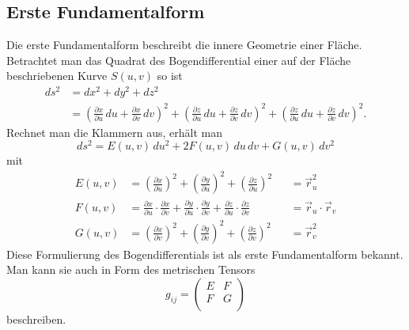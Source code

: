 \subsection{Erste Fundamentalform
\label{mongeampere:subsection:finibus}}
Die erste Fundamentalform beschreibt die innere Geometrie einer Fläche.
Betrachtet man das Quadrat des Bogendifferential einer auf der Fläche 
beschriebenen Kurve $S(u,v)$ so ist 
\begin{equation}
  \begin{split}
    d s^2 &= d x^2 + d y^2 + d z^2 \\
          &= \left(\frac{\partial x}{\partial u}\,d u + \frac{\partial x}{\partial v}\,d v  \right)^2
          + \left(\frac{\partial z}{\partial u}\,d u + \frac{\partial z}{\partial v}\,d v  \right)^2
          + \left(\frac{\partial z}{\partial u}\,d u + \frac{\partial z}{\partial v}\,d v  \right)^2.
  \end{split}
  \label{mongeampere:bogdiff}
\end{equation}
Rechnet man die Klammern aus, erhält man 
\begin{equation}
    d s^2 = E(u,v) \,d u^2 + 2F(u,v) \,d u \,d v + G(u,v)\,d v^2
    \label{mongeampere:1fundform}
\end{equation}
mit
\begin{equation*}
\begin{aligned}
     E(u,v) &= \left(\frac{\partial x}{\partial u} \right)^2 +
     \left(\frac{\partial y}{\partial u} \right)^2 +
     \left(\frac{\partial z}{\partial u} \right)^2 
            &&= \vec r_u^2\\
     F(u,v) &= 
     \frac{\partial x}{\partial u} \cdot \frac{\partial x}{\partial v} +
     \frac{\partial y}{\partial u} \cdot \frac{\partial y}{\partial v} +
     \frac{\partial z}{\partial u} \cdot \frac{\partial z}{\partial v}
            &&= \vec r_u \cdot \vec r_v \\
      G(u,v) &= \left(\frac{\partial x}{\partial v} \right)^2 +
     \left(\frac{\partial y}{\partial v} \right)^2 +
     \left(\frac{\partial z}{\partial v} \right)^2 
             &&= \vec r_v ^2
  \label{mongeampere:1fundbed}
\end{aligned}
\end{equation*}
Diese Formulierung des Bogendifferentials ist als erste Fundamentalform bekannt.
Man kann sie auch in Form des metrischen Tensors 
\begin{equation}
  g_{ij} = \begin{pmatrix}
    E & F \\
    F & G \\
  \end{pmatrix}
  \label{mongeampere:erstmettens}
\end{equation}
beschreiben.

